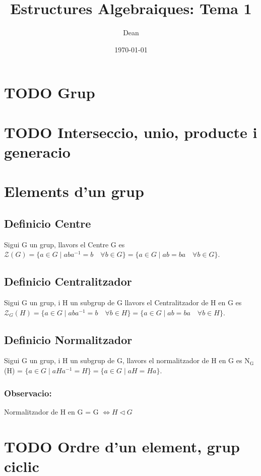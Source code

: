 \documentclass[11pt]{article}
\author{Dean}
\date{\today}
\title{Estructures Algebraiques: Tema 1}
\begin{document}
\maketitle
\setcounter{tocdepth}{4}
\tableofcontents


\section{{\bfseries\sffamily TODO} Grup}
\label{sec:org530c9c2}
\section{{\bfseries\sffamily TODO} Interseccio, unio, producte i generacio}
\label{sec:orga30edb4}
\section{Elements d'un grup}
\label{sec:orgcbc6cf2}
\subsection{Definicio Centre}
\label{sec:org6269bfc}
Sigui G un grup, llavors el Centre G es \(\mathcal{Z}(G) = \{ a \in G \mid aba^{-1} = b \quad \forall b \in G \} = \{ a \in G \mid ab = ba \quad \forall b \in G \}\).

\subsection{Definicio Centralitzador}
\label{sec:org4535fbc}
Sigui G un grup, i H un subgrup de G llavors el Centralitzador de H en G es \(\mathcal{Z}_{G}(H) = \{ a \in G \mid aba^{-1} = b \quad \forall b \in H \} = \{ a \in G \mid ab = ba \quad \forall b \in H \}\).

\subsection{Definicio Normalitzador}
\label{sec:org12ec9e5}
Sigui G un grup, i H un subgrup de G, llavors el normalitzador de H en G es N\(_{\text{G}}\)(H) = \(\{ a \in G \mid aHa^{-1} = H \} = \{ a \in G \mid aH = Ha \}\).

\subsubsection{Observacio:}
\label{sec:org177e8fd}
Normalitzador de H en G = G \(\iff H \vartriangleleft G\)
\section{{\bfseries\sffamily TODO} Ordre d'un element, grup ciclic}
\label{sec:org449815d}
\end{document}
